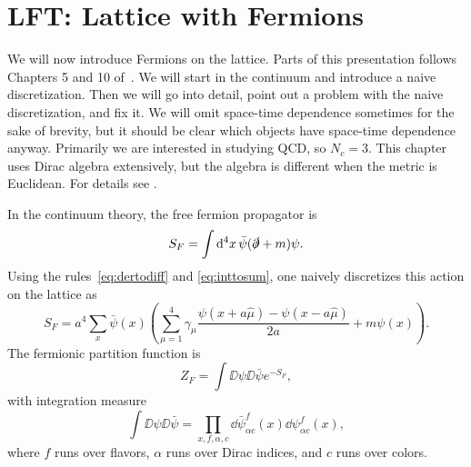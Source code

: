 \chapter{LFT: Lattice with Fermions}
We will now introduce Fermions on the lattice. Parts of this presentation 
follows Chapters 5 and 10 of~\cite{gattringer_quantum_2010}. 
We will start in the continuum
and introduce a naive discretization. Then we will go into detail, point
out a problem with the naive discretization, and fix it. We will omit
space-time dependence sometimes for the sake of brevity, but it should
be clear which objects have space-time dependence anyway. Primarily
we are interested in studying QCD, so $N_c=3$. This chapter uses Dirac
algebra extensively, but the algebra is different when the metric
is Euclidean. For details see .

In the continuum theory, the free fermion propagator is
\begin{equation}
  S_F=\int\dd[4]{x}\bar{\psi}(\slashed{\partial}+m)\psi.
\end{equation}
Using the rules~\eqref{eq:dertodiff} and \eqref{eq:inttosum}, one naively
discretizes this action on the lattice as
\begin{equation}\label{eq:naivefermact}
  S_F=a^4\sum_x\bar{\psi}(x)\left(\sum_{\mu=1}^4\gamma_\mu
       \frac{\psi(x+a\hat{\mu})-\psi(x-a\hat{\mu})}{2a}
       +m\psi(x)\right).
\end{equation}
The fermionic partition function is
\begin{equation}
  Z_F=\int\DD{\psi}\DD{\bar{\psi}}e^{-S_F},
\end{equation}
with integration measure
\begin{equation}
  \int\DD{\psi}\DD{\bar{\psi}}
   =\prod_{x,f,\alpha,c}\dd{\bar{\psi}^f_{\alpha c}(x)}
                        \dd{\psi^f_{\alpha c}(x)},
\end{equation}
where $f$ runs over flavors, $\alpha$ runs over Dirac indices, and $c$
runs over colors.

